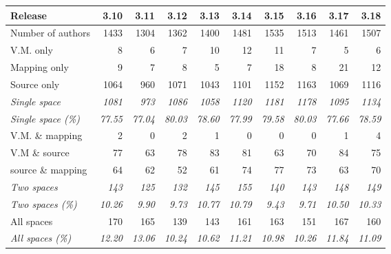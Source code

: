 \begin{table}[h]
\centering
{
\begin{adjustbox}{max width=\textwidth}
\begin{tabular}{|l|r|r|r|r|r|r|r|r|r|}
\hline
Release	 			& 3.10 & 3.11 & 3.12 & 3.13 & 3.14 & 3.15 & 3.16 & 3.17 & 3.18  \\
\hline
Number of authors	&1433	&1304	&1362	&1400	&1481	&1535	&1513	&1461	&1507\\
\hline
V.M. only			&8	&6	&7	&10	&12	&11	&7	&5	&6	\\
Mapping only 		&9	&7	&8	&5	&7	&18	&8	&21	&12	\\
Source only 			&1064	&960	&1071	&1043	&1101	&1152	&1163	&1069	&1116\\
\emph{Single space}	&\emph{1081}	&\emph{973}	 &\emph{1086	}&\emph{1058	}&\emph{1120	}&\emph{1181	}&\emph{1178	}&\emph{1095	}&\emph{1134	}\\
\emph{Single space (\%)}	&\emph{77.55}	&\emph{77.04}	&\emph{80.03}	&\emph{78.60	}&\emph{77.99}	&\emph{79.58}	&\emph{80.03	}&\emph{77.66}	&\emph{78.59}	 \\
\hline
V.M. \& mapping 		&2	&0	&2	&1	&0	&0	&0	&1	& 4  \\
V.M \&  source		&77	&63	&78	&83	&81	&63	&70	&84	& 75 \\
source \& mapping	&64	&62	&52	&61	&74	&77	&73	&63	& 70 \\
\emph{Two spaces	}&\emph{143	}&\emph{125	}&\emph{132	}&\emph{145	}&\emph{155	}&\emph{140	}&\emph{143	}&\emph{148	}&\emph{149	} \\
\emph{Two spaces (\%)}		&\emph{10.26}	&\emph{9.90}	&\emph{9.73	}&\emph{10.77	}&\emph{10.79}	&\emph{9.43}	&\emph{9.71}	&\emph{10.50}	&\emph{10.33}	 \\
\hline
All spaces 			&170	&165	&139	&143	&161	&163	&151	&167	&160	\\
\emph{All spaces (\%)}		&\emph{12.20}	&\emph{13.06	}&\emph{10.24}	&\emph{10.62}	&\emph{11.21}	&\emph{10.98}	&\emph{10.26	}&\emph{11.84}	&\emph{11.09}\\
\hline
\end{tabular}
\end{adjustbox}

}
\end{table}
